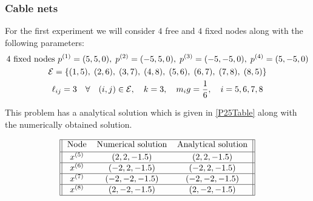 \subsubsection{Cable nets}
For the first experiment we will consider $4$ free and $4$ fixed nodes along with the following parameters:
\begin{equation*}
\begin{gathered}
    4 \text{ fixed nodes } p^{(1)} = (5,5,0),\; p^{(2)} = (-5,5,0),\; p^{(3)} = (-5,-5,0),\; p^{(4)} = (5,-5,0) \\
    \mathcal{E} = \{(1,5),\;(2,6),\;(3,7),\;(4,8),\; (5,6),\; (6,7),\; (7,8),\; (8,5) \}\\
    \ell_{ij} = 3 \quad \forall \quad (i,j) \in \mathcal{E}, \quad k = 3, \quad m_i g = \frac{1}{6}, \quad i= 5,6,7,8 
\end{gathered}
\end{equation*}

This problem has a analytical solution which is given in \eqref{P25Table} along with the numerically obtained solution.

\begin{gather}    
\label{P25Table}
\begin{tabular}{||c c c||} 
 \hline
 Node & Numerical solution & Analytical solution \\ [0.5ex] 
 \hline
$x^{(5)}$ & $(2,2,-1.5)$ & $(2,2,-1.5)$  \\ 
 \hline
 $x^{(6)}$ & $(-2,2,-1.5)$& $(-2,2,-1.5)$  \\ 
 \hline
 $x^{(7)}$ & $(-2,-2,-1.5)$ & $(-2,-2,-1.5)$\\ 
 \hline
 $x^{(8)}$ & $(2,-2,-1.5)$ & $(2,-2,-1.5)$ \\ 
 \hline
\end{tabular}
\end{gather}

